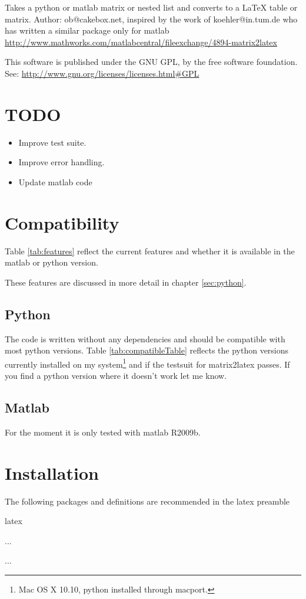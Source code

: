 Takes a python or matlab matrix or nested list and converts to a LaTeX table or matrix.
Author: ob@cakebox.net, inspired by the work of koehler@in.tum.de who has written
a similar package only for matlab
\url{http://www.mathworks.com/matlabcentral/fileexchange/4894-matrix2latex}

This software is published under the GNU GPL, by the free software
foundation. See:
\url{http://www.gnu.org/licenses/licenses.html#GPL}

\section{TODO}
\begin{itemize}
\item Improve test suite.
\item Improve error handling.
\item Update matlab code
\end{itemize}

\section{Compatibility}
Table \ref{tab:features} reflect the current features and whether it is available
in the matlab or python version.

These features are discussed in more detail in chapter \ref{sec:python}.

\subsection{Python}
The code is written without any dependencies and should be compatible with most python versions.
Table \ref{tab:compatibleTable} reflects the python versions currently installed
on my system\footnote{Mac OS X 10.10, python installed through macport.}
and if the testsuit for matrix2latex passes. If you find a python version where
it doesn't work let me know.

\subsection{Matlab}
For the moment it is only tested with matlab R2009b.

\section{Installation}
The following packages and definitions are recommended in the latex preamble 
\begin{pygments}{latex}
\providecommand{\e}[1]{\ensuremath{\times 10^{#1}}}
\usepackage{amsmath} %
\usepackage{booktabs} %
\usepackage{caption} %
...

...
\end{pygments}
